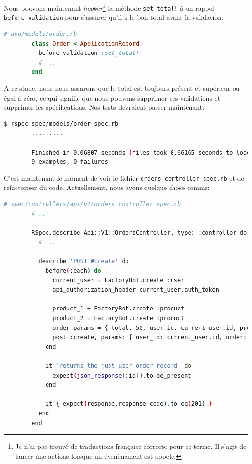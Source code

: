 \documentclass[]{report}
\begin{document}
      Nous pouvons maintenant \textit{hooker}\footnote{Je n'ai pas trouvé de traductions française correcte pour ce terme. Il s'agit de lancer une actions lorsque un évenènement est appelé.} la méthode \verb|set_total!| à un rappel \verb|before_validation| pour s'assurer qu'il a le bon total avant la validation.

      \begin{scriptsize}
        \begin{lstlisting}[language=ruby]
        # app/models/order.rb
        class Order < ApplicationRecord
          before_validation :set_total!
          # ...
        end
        \end{lstlisting}
      \end{scriptsize}

      A ce stade, nous nous assurons que le total est toujours présent et supérieur ou égal à zéro, ce qui signifie que nous pouvons supprimer ces validations et supprimer les spécifications. Nos tests devraient passer maintenant:

      \begin{scriptsize}
        \begin{lstlisting}[language=bash]
        $ rspec spec/models/order_spec.rb
        .........

        Finished in 0.06807 seconds (files took 0.66165 seconds to load)
        9 examples, 0 failures
        \end{lstlisting}
      \end{scriptsize}

      C'est maintenant le moment de voir le fichier \verb|orders_controller_spec.rb| et de refactoriser du code. Actuellement, nous avons quelque chose comme:

      \begin{scriptsize}
        \begin{lstlisting}[language=bash]
        # spec/controllers/api/v1/orders_controller_spec.rb
        # ...

        RSpec.describe Api::V1::OrdersController, type: :controller do
          # ...

          describe 'POST #create' do
            before(:each) do
              current_user = FactoryBot.create :user
              api_authorization_header current_user.auth_token

              product_1 = FactoryBot.create :product
              product_2 = FactoryBot.create :product
              order_params = { total: 50, user_id: current_user.id, product_ids: [product_1.id, product_2.id] }
              post :create, params: { user_id: current_user.id, order: order_params }
            end

            it 'returns the just user order record' do
              expect(json_response[:id]).to be_present
            end

            it { expect(response.response_code).to eq(201) }
          end
        end
        \end{lstlisting}
      \end{scriptsize}
\end{document}
